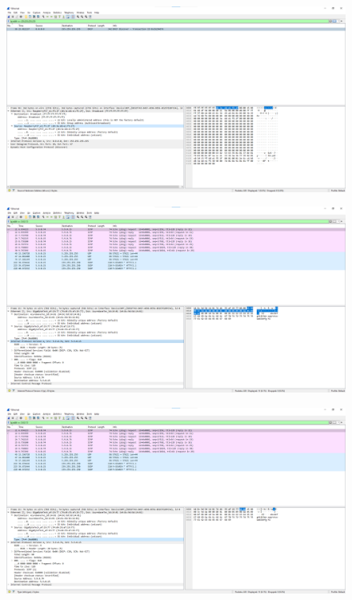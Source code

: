 \begin{figure}[p]
    \centering
    \includegraphics[width=1\textwidth]{./assets/3.7.b.source.png}
    \caption{}
    \label{fig:3.7.b.source}
\end{figure}

\begin{figure}[p]
    \centering
    \includegraphics[width=1\textwidth]{./assets/3.7.c.protocol-frame.png}
    \caption{}
    \label{fig:3.7.c.protocol-frame}
\end{figure}

\begin{figure}[p]
    \centering
    \includegraphics[width=1\textwidth]{./assets/3.7.c.protocol-in-header.png}
    \caption{}
    \label{fig:3.7.c.protocol-in-header}
\end{figure}

